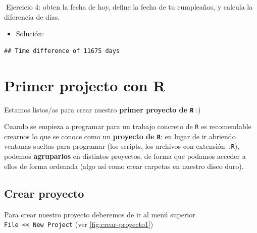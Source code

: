 \documentclass[11pt,]{book}
\newenvironment{Shaded}{\begin{snugshade}}{\end{snugshade}}
\newcommand{\CommentTok}[1]{\textcolor[rgb]{0.37,0.37,0.37}{\textit{#1}}}
\newcommand{\KeywordTok}[1]{\textcolor[rgb]{0.27,0.27,0.27}{\textbf{#1}}}
\newcommand{\NormalTok}[1]{#1}
\newcommand{\OperatorTok}[1]{\textcolor[rgb]{0.43,0.43,0.43}{\textbf{#1}}}
\newcommand{\StringTok}[1]{\textcolor[rgb]{0.5,0.5,0.5}{#1}}
\providecommand{\tightlist}{%
  \setlength{\itemsep}{0pt}\setlength{\parskip}{0pt}}
\begin{document}
📝Ejercicio 4: obten la fecha de hoy, define la fecha de tu cumpleaños, y calcula la diferencia de días.

\begin{itemize}
\tightlist
\item
  Solución:
\end{itemize}

\begin{Shaded}
\end{Shaded}

\begin{verbatim}
## Time difference of 11675 days
\end{verbatim}

\hypertarget{primer-projecto-con-r}{%
\chapter{Primer projecto con R}\label{primer-projecto-con-r}}

Estamos listos/as para crear nuestro \textbf{primer proyecto de \texttt{R}} :)

Cuando se empieza a programar para un trabajo concreto de \texttt{R} es recomendable crearnos lo que se conoce como un \textbf{proyecto de \texttt{R}}: en lugar de ir abriendo ventanas sueltas para programar (los scripts, los archivos con extensión \texttt{.R}), podemos \textbf{agruparlos} en distintos proyectos, de forma que podamos acceder a ellos de forma ordenada (algo así como crear carpetas en nuestro disco duro).

\hypertarget{crear-proyecto}{%
\section{Crear proyecto}\label{crear-proyecto}}

Para crear nuestro proyecto deberemos de ir al menú superior \texttt{File\ \textless{}\textless{}\ New\ Project} (ver \ref{fig:crear-proyecto1})
\end{document}
